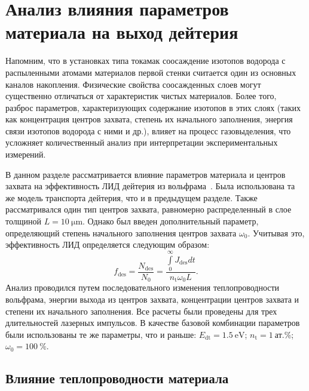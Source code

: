 \section{Анализ влияния параметров материала на выход дейтерия}\label{sec:ch4/seс3}
Напомним, что в установках типа токамак соосаждение изотопов водорода с распыленными атомами материалов первой стенки считается один из основных каналов накопления. Физические свойства соосажденных слоев могут существенно отличаться от характеристик чистых материалов. Более того, разброс параметров, характеризующих содержание изотопов в этих слоях (таких как концентрация центров захвата, степень их начального заполнения, энергия связи изотопов водорода с ними и др.), влияет на процесс газовыделения, что усложняет количественный анализ при интерпретации экспериментальных измерений.

В данном разделе рассматривается влияние параметров материала и центров захвата на эффективность ЛИД дейтерия из вольфрама~\cite{Kulagin2023}. Была использована та же модель транспорта дейтерия, что и в предыдущем разделе. Также рассматривался один тип центров захвата, равномерно распределенный в слое толщиной \( L=\SI{10}{\micro\meter}\). Однако был введен дополнительный параметр, определяющий степень начального заполнения центров захвата \(\omega_0 \). Учитывая это, эффективность ЛИД определяется следующим образом:
\begin{equation}
    f_\mathrm{des} = \dfrac{N_\mathrm{des}}{N_0}=\dfrac{\int\limits_0^\infty J_\mathrm{des}dt}{n_\mathrm{t}\omega_0 L}.
\end{equation}
Анализ проводился путем последовательного изменения теплопроводности вольфрама, энергии выхода из центров захвата, концентрации центров захвата и степени их начального заполнения. Все расчеты были проведены для трех длительностей лазерных импульсов. В качестве базовой комбинации параметров были использованы те же параметры, что и раньше: \(E_\mathrm{dt}=\SI{1.5}{\electronvolt} \); \( n_\mathrm{t}=\SI{1}{\text{ат.}\percent} \); \( \omega_0=\SI{100}{\percent} \).

\subsection{Влияние теплопроводности материала}\label{subsec:ch4/seс3/subsec1}

